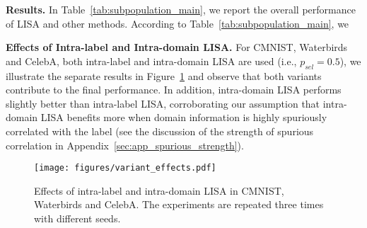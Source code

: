 \textbf{Results.} 
In Table~\ref{tab:subpopulation_main}, we report the overall performance of LISA and other methods. According to Table~\ref{tab:subpopulation_main}, we 

\textbf{Effects of Intra-label and Intra-domain LISA.} For CMNIST, Waterbirds and CelebA, both intra-label and intra-domain LISA are used (i.e., $p_{sel}=0.5$), we illustrate the separate results in Figure~\ref{fig:intraonly} and observe that both variants contribute to the final performance. In addition, intra-domain LISA performs slightly better than intra-label LISA, corroborating our assumption that intra-domain LISA benefits more when domain information is highly spuriously correlated with the label (see the discussion of the strength of spurious correlation in Appendix~\ref{sec:app_spurious_strength}). 

\begin{figure}[h]
    \centering
    \small
    \texttt{[image: figures/variant\_effects.pdf]}
    \vspace{-0.8em}
    \caption{Effects of intra-label and intra-domain LISA in CMNIST, Waterbirds and CelebA. The experiments are repeated three times with different seeds.}
    \label{fig:intraonly}
\end{figure}

